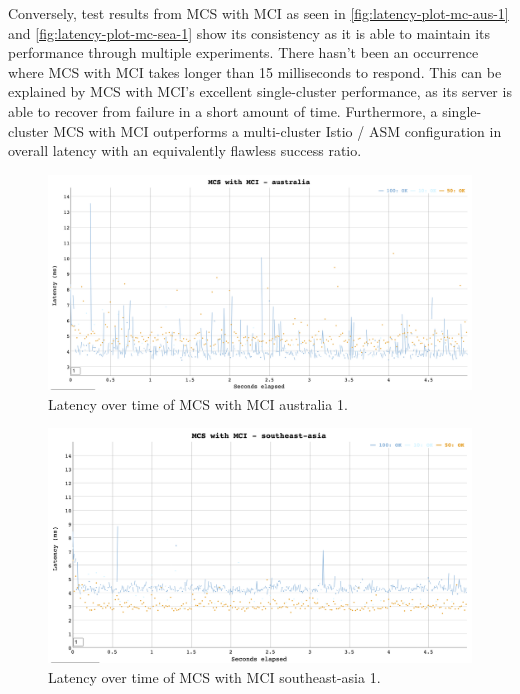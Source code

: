 Conversely, test results from MCS with MCI as seen in \autoref{fig:latency-plot-mc-aus-1} and \autoref{fig:latency-plot-mc-sea-1} show its consistency as it is able to maintain its performance through multiple experiments. There hasn't been an occurrence where MCS with MCI takes longer than 15 milliseconds to respond. This can be explained by MCS with MCI's excellent single-cluster performance, as its server is able to recover from failure in a short amount of time. Furthermore, a single-cluster MCS with MCI outperforms a multi-cluster Istio / ASM configuration in overall latency with an equivalently flawless success ratio.

\begin{figure}
	\centering
	\includegraphics[width=1\textwidth]{assets/plots/mc-aus-1.png}
    \caption{Latency over time of MCS with MCI australia 1.}
	\label{fig:latency-plot-mc-aus-1}
\end{figure}

\begin{figure}
	\centering
	\includegraphics[width=1\textwidth]{assets/plots/mc-sea-1.png}
	\caption{Latency over time of MCS with MCI southeast-asia 1.}
	\label{fig:latency-plot-mc-sea-1}
\end{figure}


